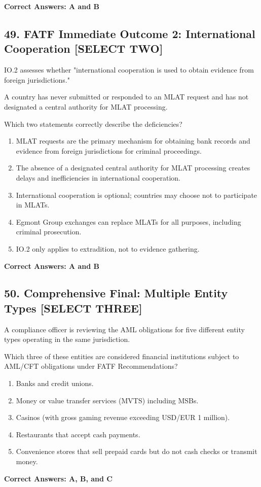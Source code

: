 \documentclass[11pt,a4paper]{article}
\begin{document}
	\textbf{Correct Answers: A and B}
	
	\subsection{49. FATF Immediate Outcome 2: International Cooperation \textnormal{[SELECT TWO]}}
	
	IO.2 assesses whether "international cooperation is used to obtain evidence from foreign jurisdictions."
	
	A country has never submitted or responded to an MLAT request and has not designated a central authority for MLAT processing.
	
	Which two statements correctly describe the deficiencies?
	
	\begin{enumerate}[label=\Alph*.]
		\item MLAT requests are the primary mechanism for obtaining bank records and evidence from foreign jurisdictions for criminal proceedings.
		\item The absence of a designated central authority for MLAT processing creates delays and inefficiencies in international cooperation.
		\item International cooperation is optional; countries may choose not to participate in MLATs.
		\item Egmont Group exchanges can replace MLATs for all purposes, including criminal prosecution.
		\item IO.2 only applies to extradition, not to evidence gathering.
	\end{enumerate}
	
	\textbf{Correct Answers: A and B}
	
	\subsection{50. Comprehensive Final: Multiple Entity Types \textnormal{[SELECT THREE]}}
	
	A compliance officer is reviewing the AML obligations for five different entity types operating in the same jurisdiction.
	
	Which three of these entities are considered financial institutions subject to AML/CFT obligations under FATF Recommendations?
	
	\begin{enumerate}[label=\Alph*.]
		\item Banks and credit unions.
		\item Money or value transfer services (MVTS) including MSBs.
		\item Casinos (with gross gaming revenue exceeding USD/EUR 1 million).
		\item Restaurants that accept cash payments.
		\item Convenience stores that sell prepaid cards but do not cash checks or transmit money.
	\end{enumerate}
	
	\textbf{Correct Answers: A, B, and C}
	
\end{document}
